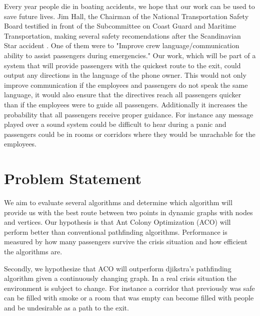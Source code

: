 Every year people die in boating accidents, we hope that our work can be                                                                         %
used to save future lives. Jim Hall, the Chairman of the National Transportation 
Safety Board testified in front of the Subcommittee on Coast Guard and Maritime 
Transportation, making several safety recomendations after the Scandinavian Star
accident \cite{ntsb}. One of them were to "Improve crew language/communication 
ability to assist passengers during emergencies." Our work, which will be part of a system
that will provide passengers with the quickest route to the exit, could output 
any directions in the language of the phone owner. This would not only improve 
communication if the employees and passengers do not speak the same language, 
it would also ensure that the directives reach all passengers quicker than if the employees 
were to guide all passengers. Additionally it increases the probability that all passengers 
receive proper guidance. For instance any message played over a sound system could be
difficult to hear during a panic and passengers could be in rooms or corridors
where they would be unrachable for the employees.



\section{Problem Statement}

We aim to evaluate several algorithms and determine which algorithm will provide us with the         %
best route between two points in dynamic graphs with nodes and vertices. Our hypothesis
is that Ant Colony Optimization (ACO) will perform better than conventional pathfinding %
algorithms. Performance is measured by how many passengers survive the crisis situation
and how efficient the algorithms are. 

Secondly, we hypothesize that ACO will outperform djikstra's pathfinding algorithm       %
given a continuously changing graph. In a real crisis situation the environment is subject
to change. For instance a corridor that previously was safe can be filled with smoke
or a room that was empty can become filled with people and be undesirable as a path
to the exit.

